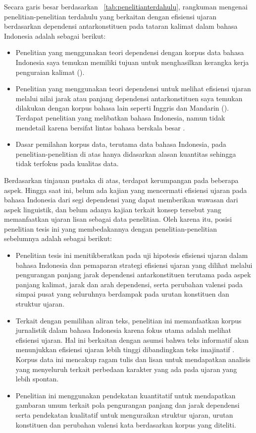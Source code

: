 Secara garis besar berdasarkan \tab~\ref{tab:penelitianterdahulu}, rangkuman mengenai penelitian-penelitian terdahulu yang berkaitan dengan efisiensi ujaran berdasarkan dependensi antarkonstituen pada tataran kalimat dalam bahasa Indonesia adalah sebagai berikut:
\begin{itemize}
\item Penelitian yang menggunakan teori dependensi dengan korpus data bahasa Indonesia saya temukan memiliki tujuan untuk menghasilkan kerangka kerja penguraian kalimat (\citealp{kamayani2011dependency, green2012indonesian, irmawati2015dependency}).
\item Penelitian yang menggunakan teori dependensi untuk melihat efisiensi ujaran melalui nilai jarak atau panjang dependensi antarkonstituen saya temukan dilakukan dengan korpus bahasa lain seperti Inggris dan Mandarin (\citealp{jiang2015effects, wang2017effects}). Terdapat penelitian yang melibatkan bahasa Indonesia, namun tidak mendetail karena bersifat lintas bahasa berskala besar \citep{futrell2015large}.
\item Dasar pemilahan korpus data, terutama data bahasa Indonesia, pada penelitian-penelitian di atas hanya didasarkan alasan kuantitas sehingga tidak terfokus pada kualitas data. 
\end{itemize}
Berdasarkan tinjauan pustaka di atas, terdapat kerumpangan pada beberapa aspek. Hingga saat ini, belum ada kajian yang mencermati efisiensi ujaran pada bahasa Indonesia dari segi dependensi yang dapat memberikan wawasan dari aspek linguistik, dan belum adanya kajian terkait konsep tersebut yang memanfaatkan ujaran lisan sebagai data penelitian. Oleh karena itu, posisi penelitian tesis ini yang membedakannya dengan penelitian-penelitian sebelumnya adalah sebagai berikut:
\begin{itemize}
\item Penelitian tesis ini menitikberatkan pada uji hipotesis efisiensi ujaran dalam bahasa Indonesia dan pemaparan strategi efisiensi ujaran yang dilihat melalui pengurangan panjang jarak dependensi antarkonstituen terutama pada aspek panjang kalimat, jarak dan arah dependensi, serta perubahan valensi pada simpai pusat yang seluruhnya berdampak pada urutan konstituen dan struktur ujaran.
\item Terkait dengan pemilihan aliran teks, penelitian ini memanfaatkan korpus jurnalistik dalam bahasa Indonesia karena fokus utama adalah melihat efisiensi ujaran. Hal ini berkaitan dengan asumsi bahwa teks informatif akan menunjukkan efisiensi ujaran lebih tinggi dibandingkan teks imajinatif \citep{wang2017effects}. Korpus data ini mencakup ragam tulis dan lisan untuk mendapatkan analisis yang menyeluruh terkait perbedaan karakter yang ada pada ujaran yang lebih spontan.
\item Penelitian ini menggunakan pendekatan kuantitatif untuk mendapatkan gambaran umum terkait pola pengurangan panjang dan jarak dependensi serta pendekatan kualitatif untuk menguraikan struktur ujaran, urutan konstituen dan perubahan valensi kata berdasarkan korpus yang diteliti.
\end{itemize}

